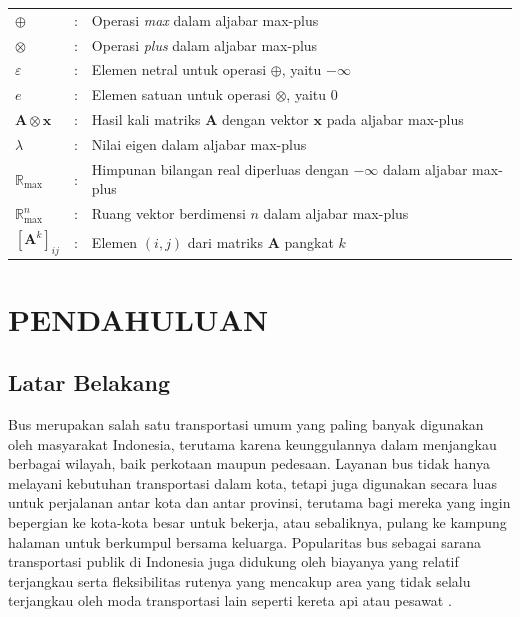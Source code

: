 \documentclass{file/TA-ITS}
\theoremstyle{definition}
\theoremstyle{definition}
\theoremstyle{plain}
\begin{document}
\DaftarSimbol
\begin{flushleft}
\begin{tabular}{lrl}

$\oplus$ &:& Operasi \textit{max} dalam aljabar max-plus \\

$\otimes$ &:& Operasi \textit{plus} dalam aljabar max-plus \\

$\varepsilon$ &:& Elemen netral untuk operasi $\oplus$, yaitu $-\infty$ \\

$e$ &:& Elemen satuan untuk operasi $\otimes$, yaitu $0$ \\

$\mathbf{A} \otimes \mathbf{x}$ &:& Hasil kali matriks $\mathbf{A}$ dengan vektor $\mathbf{x}$ pada aljabar max-plus \\

$\lambda$ &:& Nilai eigen dalam aljabar max-plus \\

$\mathbb{R}_{\max}$ &:& Himpunan bilangan real diperluas dengan $-\infty$ dalam aljabar max-plus \\

$\mathbb{R}_{\max}^n$ &:& Ruang vektor berdimensi $n$ dalam aljabar max-plus \\

$[\mathbf{A}^k]_{ij}$ &:& Elemen $(i,j)$ dari matriks $\mathbf{A}$ pangkat $k$ \\

\end{tabular}
\end{flushleft}

\BagianInti

\chapter{PENDAHULUAN}
\section{Latar Belakang}
\indent Bus merupakan salah satu transportasi umum yang paling banyak digunakan oleh masyarakat Indonesia, terutama karena keunggulannya dalam menjangkau berbagai wilayah, baik perkotaan maupun pedesaan. Layanan bus tidak hanya melayani kebutuhan transportasi dalam kota, tetapi juga digunakan secara luas untuk perjalanan antar kota dan antar provinsi, terutama bagi mereka yang ingin bepergian ke kota-kota besar untuk bekerja, atau sebaliknya, pulang ke kampung halaman untuk berkumpul bersama keluarga. Popularitas bus sebagai sarana transportasi publik di Indonesia juga didukung oleh biayanya yang relatif terjangkau serta fleksibilitas rutenya yang mencakup area yang tidak selalu terjangkau oleh moda transportasi lain seperti kereta api atau pesawat \cite{Arum2015}.
\end{document}
